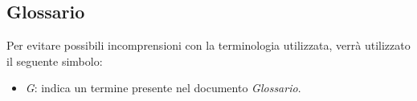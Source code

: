 \subsection{Glossario}
    Per evitare possibili incomprensioni con la terminologia utilizzata, verrà utilizzato il seguente simbolo:
    \begin{itemize}
        \item \textit{G}: indica un termine presente nel documento \textit{Glossario}.  
    \end{itemize}
